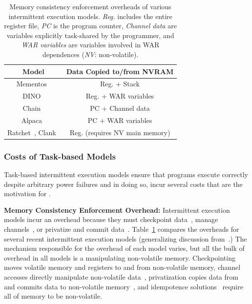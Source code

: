 \begin{table}
	\centering
	\footnotesize
	\begin{tabular}{|c|c|}
		\hline
		Model & Data Copied to/from NVRAM \\
		\hline\hline
		Mementos~\cite{mementos}                             & Reg. + Stack     \\
		DINO~\cite{dino}                                     & Reg. + WAR variables \\
		Chain~\cite{chain}                                   & PC   + Channel data\\
		Alpaca~\cite{alpaca}                                 & PC   + WAR variables \\
		Ratchet~\cite{ratchet}, Clank~\cite{hicks_isca_2017} & Reg. (requires NV main memory) \\
		\hline
	\end{tabular}
	\caption{Memory consistency enforcement overheads of various intermittent execution models. \emph{Reg.} includes the entire register file, \emph{PC} is the program counter, \emph{Channel data} are variables explicitly task-shared by the programmer, and \emph{WAR variables} are variables involved in WAR dependences (\emph{NV}: non-volatile).}
	\label{table:chechpoint_comparison}
\end{table}

\subsubsection{Costs of Task-based Models}

Task-based intermittent execution models ensure that programs execute correctly despite arbitrary power failures and in doing so, incur several costs that are the motivation for \sys. 

\noindent \textbf{Memory Consistency Enforcement Overhead:} Intermittent execution models incur an overhead because they must checkpoint data~\cite{dino,ratchet,quickrecall,mementos}, manage channels~\cite{chain}, or privatize and commit data~\cite{alpaca}. Table~\ref{table:chechpoint_comparison} compares the overheads for several recent intermittent execution models (generalizing discussion from~\cite[Sec. 2.4]{alpaca}.) The mechanism responsible for the overhead of each model varies, but all the bulk of overhead in all models is a manipulating non-volatile memory. Checkpointing moves volatile memory and registers to and from non-volatile memory, channel accesses directly manipulate non-volatile data~\cite{chain}, privatization copies data from and commits data to non-volatile memory~\cite{alpaca}, and idempotence solutions~\cite{ratchet} require all of memory to be non-volatile.  

